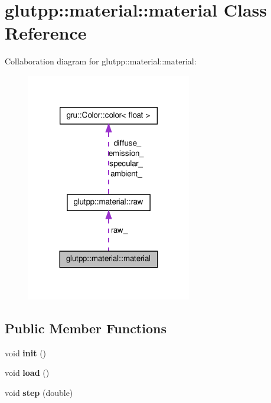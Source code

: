 \hypertarget{classglutpp_1_1material_1_1material}{\section{glutpp\-:\-:material\-:\-:material \-Class \-Reference}
\label{classglutpp_1_1material_1_1material}
}


\-Collaboration diagram for glutpp\-:\-:material\-:\-:material\-:\nopagebreak
\begin{figure}[H]
\begin{center}
\leavevmode
\includegraphics[width=204pt]{classglutpp_1_1material_1_1material__coll__graph}
\end{center}
\end{figure}
\subsection*{\-Public \-Member \-Functions}
\begin{DoxyCompactItemize}
\item 
\hypertarget{classglutpp_1_1material_1_1material_a5610c4dc9129ecc5fa6b28814fcf147e}{void {\bfseries init} ()}\label{classglutpp_1_1material_1_1material_a5610c4dc9129ecc5fa6b28814fcf147e}

\item 
\hypertarget{classglutpp_1_1material_1_1material_a70897de59b78a8fbd8ddf85e92385e98}{void {\bfseries load} ()}\label{classglutpp_1_1material_1_1material_a70897de59b78a8fbd8ddf85e92385e98}

\item 
\hypertarget{classglutpp_1_1material_1_1material_ae2b179fde85146dc1d8b0ca98e92cb7e}{void {\bfseries step} (double)}\label{classglutpp_1_1material_1_1material_ae2b179fde85146dc1d8b0ca98e92cb7e}

\end{DoxyCompactItemize}
